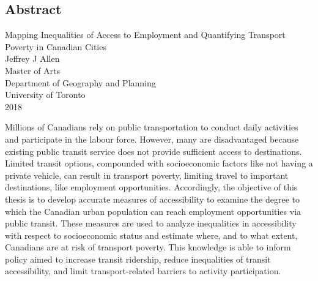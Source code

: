 \documentclass[11 pt, letterpaper]{article}
\begin{document}
{
\begin{center}
\section*{Abstract}
	\singlespacing
	{Mapping Inequalities of Access to Employment and Quantifying Transport Poverty in Canadian Cities}\\[2ex]
	{Jeffrey J Allen}\\
	{Master of Arts}\\
	Department of Geography and Planning\\
	University of Toronto\\
	{2018}\\
\end{center}
Millions of Canadians rely on public transportation to conduct daily activities and participate in the labour force. However, many are disadvantaged because existing public transit service does not provide sufficient access to destinations. Limited transit options, compounded with socioeconomic factors like not having a private vehicle, can result in transport poverty, limiting travel to important destinations, like employment opportunities. Accordingly, the objective of this thesis is to develop accurate measures of accessibility to examine the degree to which the Canadian urban population can reach employment opportunities via public transit. These measures are used to analyze inequalities in accessibility with respect to socioeconomic status and estimate where, and to what extent, Canadians are at risk of transport poverty. This knowledge is able to inform policy aimed to increase transit ridership, reduce inequalities of transit accessibility, and limit transport-related barriers to activity participation.

\vspace{12mm}



\newpage



\tableofcontents


\newpage



\listoffigures



\newpage


}
\end{document}
